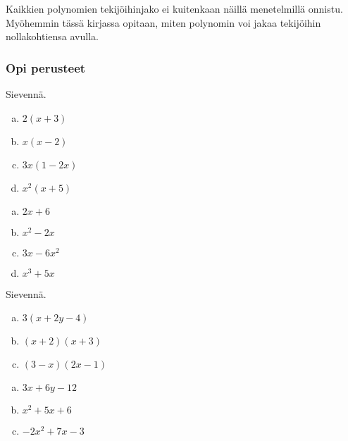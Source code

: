 Kaikkien polynomien tekijöihinjako ei kuitenkaan näillä menetelmillä onnistu. Myöhemmin tässä kirjassa opitaan,
miten polynomin voi jakaa tekijöihin nollakohtiensa avulla.

\Harjoitustehtavat

\subsubsection*{Opi perusteet}

\begin{tehtava}
    Sievennä.
    \begin{enumerate}[a)]
        \item $2(x+3)$
        \item $x(x - 2)$
        \item $3x(1-2x)$
        \item $x^2(x + 5)$
    \end{enumerate}
    \begin{vastaus}
        \begin{enumerate}[a)]
            \item $2x+6$
            \item $x^2 - 2x$
            \item $3x-6x^2$
            \item $x^3 + 5x$
        \end{enumerate}
    \end{vastaus}
\end{tehtava}

\begin{tehtava}
    Sievennä.
    \begin{enumerate}[a)]
        \item $3(x+2y-4)$
        \item $(x+2)(x + 3)$
        \item $(3-x)(2x-1)$
\end{enumerate}
    \begin{vastaus}
        \begin{enumerate}[a)]
            \item $3x+6y-12$
            \item $x^2 +5x+6$
            \item $-2x^2+7x-3$
        \end{enumerate}
    \end{vastaus}
\end{tehtava}

